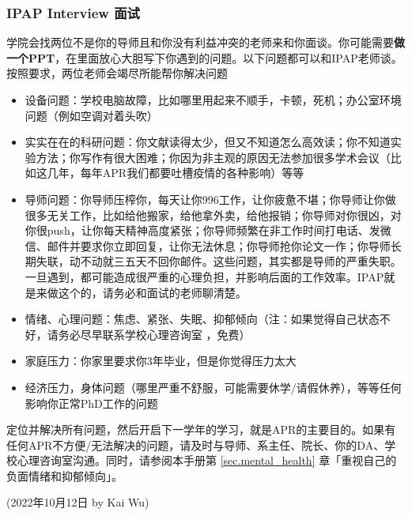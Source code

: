 \subsubsection{IPAP Interview 面试}
\label{sec.IPAP}
学院会找两位不是你的导师且和你没有利益冲突的老师来和你面谈。你可能需要\textbf{做一个PPT}，在里面放心大胆写下你遇到的问题。以下问题都可以和IPAP老师谈。按照要求，两位老师会竭尽所能帮你解决问题
\begin{itemize}
    \item 设备问题：学校电脑故障，比如哪里用起来不顺手，卡顿，死机；办公室环境问题（例如空调对着头吹）
    \item 实实在在的科研问题：你文献读得太少，但又不知道怎么高效读；你不知道实验方法；你写作有很大困难；你因为非主观的原因无法参加很多学术会议（比如这几年，每年APR我们都要吐槽疫情的各种影响）等等
    \item 导师问题：你导师压榨你，每天让你996工作，让你疲惫不堪；你导师让你做很多无关工作，比如给他搬家，给他拿外卖，给他报销；你导师对你很凶，对你很push，让你每天精神高度紧张；你导师频繁在非工作时间打电话、发微信、邮件并要求你立即回复，让你无法休息；你导师抢你论文一作；你导师长期失联，动不动就三五天不回你邮件。这些问题，其实都是导师的严重失职。一旦遇到，都可能造成很严重的心理负担，并影响后面的工作效率。IPAP就是来做这个的，请务必和面试的老师聊清楚。
    \item 情绪、心理问题：焦虑、紧张、失眠、抑郁倾向（注：如果觉得自己状态不好，请务必尽早联系学校心理咨询室  ，免费）
    \item 家庭压力：你家里要求你3年毕业，但是你觉得压力太大
    \item 经济压力，身体问题（哪里严重不舒服，可能需要休学/请假休养），等等任何影响你正常PhD工作的问题
\end{itemize}

\vspace{5mm}
定位并解决所有问题，然后开启下一学年的学习，就是APR的主要目的。如果有任何APR不方便/无法解决的问题，请及时与导师、系主任、院长、你的DA、学校心理咨询室沟通。同时，请参阅本手册第 \ref{sec.mental_health} 章「重视自己的负面情绪和抑郁倾向」。


\begin{flushright}
(2022年10月12日 by Kai Wu)
\end{flushright}